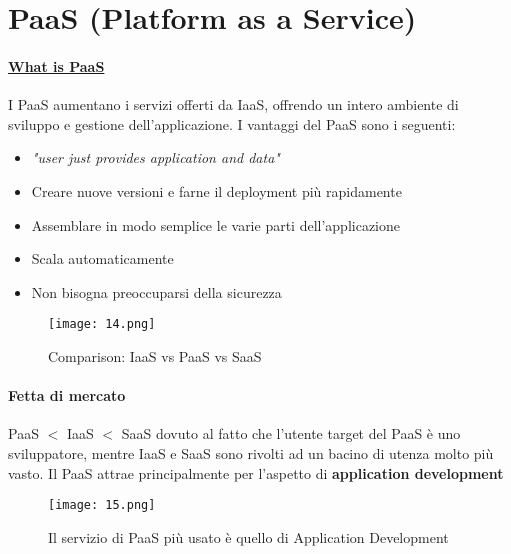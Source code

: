 \newpage
\section{PaaS (Platform as a Service)}

\paragraph{\href{https://www.youtube.com/watch?v=6L1eQe5E1K4}{What is PaaS}} 
I PaaS aumentano i servizi offerti da IaaS, offrendo un intero ambiente di sviluppo e gestione dell’applicazione. I vantaggi del PaaS sono i seguenti:
\begin{itemize}
    \item \textit{"user just provides application and data"}
    \item Creare nuove versioni e farne il deployment più rapidamente
    \item Assemblare in modo semplice le varie parti dell’applicazione
    \item Scala automaticamente
    \item Non bisogna preoccuparsi della sicurezza
\end{itemize}

\begin{figure}[h!]
    \centering
    \texttt{[image: 14.png]}
    \caption{Comparison: IaaS vs PaaS vs SaaS}
\end{figure}

\paragraph{Fetta di mercato} PaaS $<$ IaaS $<$ SaaS dovuto al fatto che l'utente target del PaaS è uno sviluppatore, mentre IaaS e SaaS sono rivolti ad un bacino di utenza molto più vasto.  Il PaaS attrae principalmente per l'aspetto di \textbf{application development}
\begin{figure}[h!]
    \centering
    \texttt{[image: 15.png]}
    \caption{Il servizio di PaaS più usato è quello di Application Development}
\end{figure}

